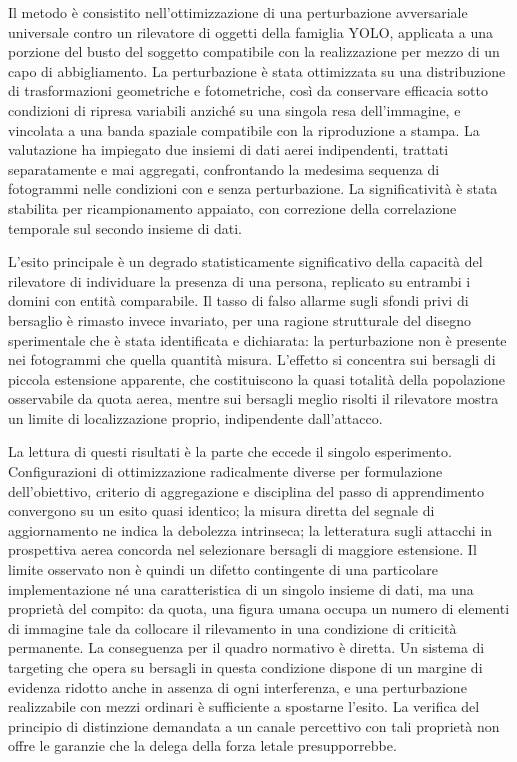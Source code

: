 \documentclass[a4paper,12pt]{report}
\begin{document}
Il metodo è consistito nell'ottimizzazione di una perturbazione avversariale universale contro un rilevatore di oggetti della famiglia YOLO, applicata a una porzione del busto del soggetto compatibile con la realizzazione per mezzo di un capo di abbigliamento. La perturbazione è stata ottimizzata su una distribuzione di trasformazioni geometriche e fotometriche, così da conservare efficacia sotto condizioni di ripresa variabili anziché su una singola resa dell'immagine, e vincolata a una banda spaziale compatibile con la riproduzione a stampa. La valutazione ha impiegato due insiemi di dati aerei indipendenti, trattati separatamente e mai aggregati, confrontando la medesima sequenza di fotogrammi nelle condizioni con e senza perturbazione. La significatività è stata stabilita per ricampionamento appaiato, con correzione della correlazione temporale sul secondo insieme di dati.

L'esito principale è un degrado statisticamente significativo della capacità del rilevatore di individuare la presenza di una persona, replicato su entrambi i domini con entità comparabile. Il tasso di falso allarme sugli sfondi privi di bersaglio è rimasto invece invariato, per una ragione strutturale del disegno sperimentale che è stata identificata e dichiarata: la perturbazione non è presente nei fotogrammi che quella quantità misura. L'effetto si concentra sui bersagli di piccola estensione apparente, che costituiscono la quasi totalità della popolazione osservabile da quota aerea, mentre sui bersagli meglio risolti il rilevatore mostra un limite di localizzazione proprio, indipendente dall'attacco.

La lettura di questi risultati è la parte che eccede il singolo esperimento. Configurazioni di ottimizzazione radicalmente diverse per formulazione dell'obiettivo, criterio di aggregazione e disciplina del passo di apprendimento convergono su un esito quasi identico; la misura diretta del segnale di aggiornamento ne indica la debolezza intrinseca; la letteratura sugli attacchi in prospettiva aerea concorda nel selezionare bersagli di maggiore estensione. Il limite osservato non è quindi un difetto contingente di una particolare implementazione né una caratteristica di un singolo insieme di dati, ma una proprietà del compito: da quota, una figura umana occupa un numero di elementi di immagine tale da collocare il rilevamento in una condizione di criticità permanente. La conseguenza per il quadro normativo è diretta. Un sistema di targeting che opera su bersagli in questa condizione dispone di un margine di evidenza ridotto anche in assenza di ogni interferenza, e una perturbazione realizzabile con mezzi ordinari è sufficiente a spostarne l'esito. La verifica del principio di distinzione demandata a un canale percettivo con tali proprietà non offre le garanzie che la delega della forza letale presupporrebbe.
\end{document}
